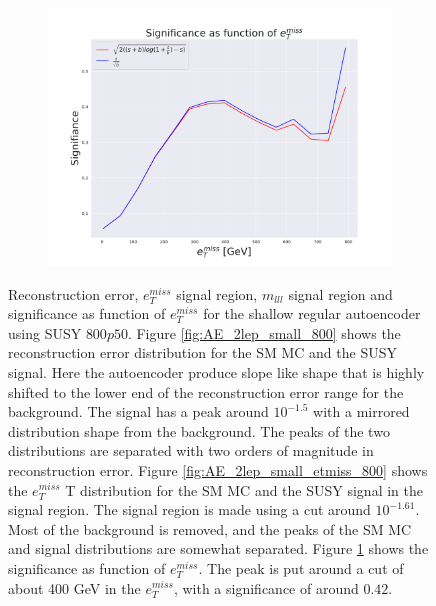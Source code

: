 \begin{figure}[H]
    \hfill  
    \begin{subfigure}{.50\textwidth}
        \includegraphics[width=\textwidth]{Figures/AE_testing/small/2lep/significance_etmiss_800p0p050_-1.6117055611472277.pdf}
        \caption{}
        \label{fig:AE_2lep_small_signi_800}
    \end{subfigure}
    \hfill      
    \caption[2lep shallow network | $800p50$ | AE]{Reconstruction error, $e_T^{miss}$ signal region, $m_{lll}$ signal region and significance as function of 
    $e_T^{miss}$ for the shallow regular autoencoder using SUSY $800p50$. 
    Figure \ref{fig:AE_2lep_small_800} shows the reconstruction error distribution for the SM MC and the SUSY signal. 
Here the autoencoder produce slope like shape that is highly shifted to the lower end of the reconstruction error range
for the background. The signal has a peak around $10^{-1.5}$ with a mirrored distribution shape from the background. The peaks of the two distributions are separated
with two orders of magnitude in reconstruction error. Figure \ref{fig:AE_2lep_small_etmiss_800} shows the $e_T^{miss}$
T distribution for the SM MC and the SUSY signal in the signal region. The signal region is made using a cut around
$10^{-1.61}$. Most of the background is removed, and the peaks of the SM MC and signal distributions are
somewhat separated.  Figure \ref{fig:AE_2lep_small_signi_800} shows the significance as function of $e_T^{miss}$. The peak is put 
around a cut of about 400 GeV in the $e_T^{miss}$, with a significance of around $0.42$.}
    \label{fig:AE_2lep_small_rec_sig_signi_800}
\end{figure}


